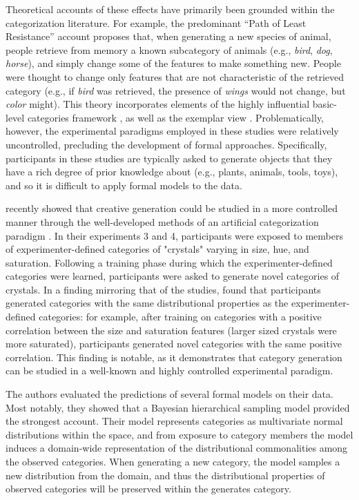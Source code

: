 \documentclass[12pt]{article}
\begin{document}
\begin{flushleft}
Theoretical accounts of these effects have primarily been grounded within the categorization literature. For example, the predominant ``Path of Least Resistance'' account \citep[see][]{ward1994structured,ward1995s,ward2002role} proposes that, when generating a new species of animal, people retrieve from memory a known subcategory of animals (e.g., \textit{bird}, \textit{dog}, \textit{horse}), and simply change some of the features to make something new. People were thought to change only features that are not characteristic of the retrieved category (e.g., if \textit{bird} was retrieved, the presence of \textit{wings} would not change, but \textit{color} might). This theory incorporates elements of the highly influential basic-level categories framework \citep{rosch1975cognitive,rosch1976basic}, as well as the exemplar view \citep{medin1978context,nosofsky1984choice,nosofsky1986attention}. Problematically, however, the experimental paradigms employed in these studies were relatively uncontrolled, precluding the development of formal approaches. Specifically, participants in these studies are typically asked to generate objects that they have a rich degree of prior knowledge about (e.g., plants, animals, tools, toys), and so it is difficult to apply formal models to the data.

\cite{jern2013probabilistic} recently showed that creative generation could be studied in a more controlled manner through the well-developed methods of an artificial categorization paradigm \citep[see][]{kurtz2015human}. In their experiments 3 and 4, participants were exposed to members of experimenter-defined categories of "crystals" varying in size, hue, and saturation. Following a training phase during which the experimenter-defined categories were learned, participants were asked to generate novel categories of crystals. In a finding mirroring that of the \cite{ward1994structured} studies, \citeauthor{jern2013probabilistic} found that participants generated categories with the same distributional properties as the experimenter-defined categories: for example, after training on categories with a positive correlation between the size and saturation features (larger sized crystals were more saturated), participants generated novel categories with the same positive correlation. This finding is notable, as it demonstrates that category generation can be studied in a well-known and highly controlled experimental paradigm.

The authors evaluated the predictions of several formal models on their data. Most notably, they showed that a Bayesian hierarchical sampling model provided the strongest account. Their model represents categories as multivariate normal distributions within the space, and from exposure to category members the model induces a domain-wide representation of the distributional commonalities among the observed categories. When generating a new category, the model samples a new distribution from the domain, and thus the distributional properties of observed categories will be preserved within the generates category.


\end{flushleft}
\end{document}
